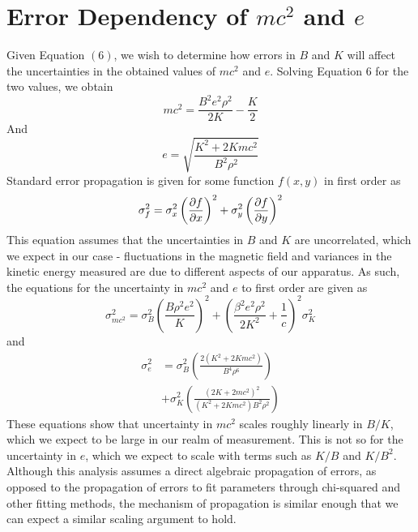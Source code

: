 

\clearpage
\appendix
\section{Error Dependency of $mc^2$ and $e$}
Given Equation $(6)$, we wish to determine how errors in $B$ and $K$ will affect the uncertainties in the obtained values of $mc^2$ and $e$. Solving Equation 6 for the two values, we obtain
\begin{equation}
    mc^2 = \frac{B^2 e^2 \rho^2}{2K} - \frac{K}{2}
  \end{equation}
  And
  \begin{equation}
    e = \sqrt{\frac{K^2 + 2Kmc^2}{B^2 \rho^2}}
  \end{equation}
  Standard error propagation is given for some function $f(x,y)$ in first order as
  \begin{equation}
    \sigma_f^2 = \sigma_x^2 \left(\pdv{f}{x}\right)^2 + \sigma_y^2 \left(\pdv{f}{y}\right)^2
  \end{equation}
  This equation assumes that the uncertainties in $B$ and $K$ are uncorrelated, which we expect in our case - fluctuations in the magnetic field and variances in the kinetic energy measured are due to different aspects of our apparatus. As such, the equations for the uncertainty in $mc^2$ and $e$ to first order are given as
  \begin{equation}
    \sigma_{mc^2}^2 = \sigma_B^2 \left(\frac{B \rho^2 e^2}{K}\right)^2 + \left(\frac{\beta^2 e^2 \rho^2}{2K^2} + \frac{1}{c}\right)^2 \sigma_K^2 
  \end{equation}
  and
  \begin{equation}
    \begin{aligned}
    \sigma_e^2 &= \sigma_B^2 \left(\frac{2(K^2 + 2Kmc^2)}{B^4 \rho^6}\right) 
    \\
    &+ \sigma_K^2 \left(\frac{(2K + 2 mc^2)^2}{(K^2 + 2Kmc^2)B^2 \rho^2}\right)
  \end{aligned}
\end{equation}
These equations show that uncertainty in $mc^2$ scales roughly linearly in $B/K$, which we expect to be large in our realm of measurement. This is not so for the uncertainty in $e$, which we expect to scale with terms such as $K/B$ and $K/B^2$. Although this analysis assumes a direct algebraic propagation of errors, as opposed to the propagation of errors to fit parameters through chi-squared and other fitting methods, the mechanism of propagation is similar enough that we can expect a similar scaling argument to hold.

